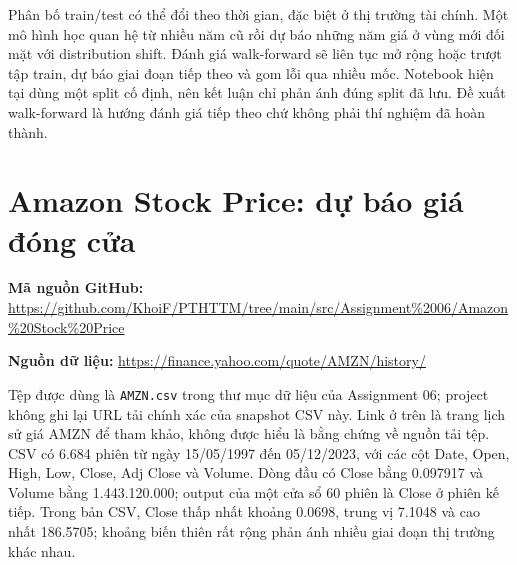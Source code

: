 \documentclass[12pt,a4paper]{report}
\newcommand{\datasetlink}[1]{\par\noindent\textbf{Nguồn dữ liệu: }\url{#1}\par}
\begin{document}
Phân bố train/test có thể đổi theo thời gian, đặc biệt ở thị trường tài chính. Một mô hình học quan hệ từ nhiều năm cũ rồi dự báo những năm giá ở vùng mới đối mặt với distribution shift. Đánh giá walk-forward sẽ liên tục mở rộng hoặc trượt tập train, dự báo giai đoạn tiếp theo và gom lỗi qua nhiều mốc. Notebook hiện tại dùng một split cố định, nên kết luận chỉ phản ánh đúng split đã lưu. Đề xuất walk-forward là hướng đánh giá tiếp theo chứ không phải thí nghiệm đã hoàn thành.

\section{Amazon Stock Price: dự báo giá đóng cửa}
\noindent\textbf{Mã nguồn GitHub: }\url{https://github.com/KhoiF/PTHTTM/tree/main/src/Assignment%2006/Amazon%20Stock%20Price}\par
\datasetlink{https://finance.yahoo.com/quote/AMZN/history/}
Tệp được dùng là \texttt{AMZN.csv} trong thư mục dữ liệu của Assignment 06; project không ghi lại URL tải chính xác của snapshot CSV này. Link ở trên là trang lịch sử giá AMZN để tham khảo, không được hiểu là bằng chứng về nguồn tải tệp. CSV có 6.684 phiên từ ngày 15/05/1997 đến 05/12/2023, với các cột Date, Open, High, Low, Close, Adj Close và Volume. Dòng đầu có Close bằng 0.097917 và Volume bằng 1.443.120.000; output của một cửa sổ 60 phiên là Close ở phiên kế tiếp. Trong bản CSV, Close thấp nhất khoảng 0.0698, trung vị 7.1048 và cao nhất 186.5705; khoảng biến thiên rất rộng phản ánh nhiều giai đoạn thị trường khác nhau.
\end{document}

